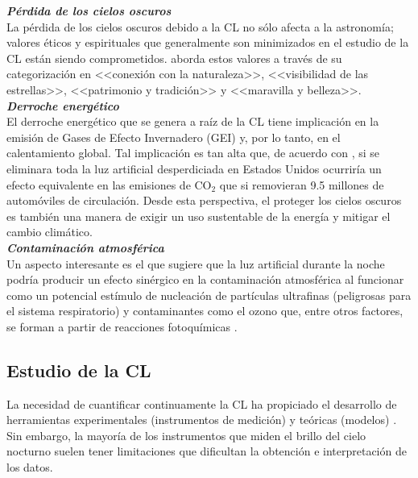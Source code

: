 \textit{\textbf{Pérdida de los cielos oscuros}}\\ 

La pérdida de los cielos oscuros debido a la CL no sólo afecta a la astronomía; valores éticos y espirituales que generalmente son minimizados en el estudio de la CL están siendo comprometidos. \cite{Stone2017} aborda estos valores a través de su categorización en <<conexión con la naturaleza>>, <<visibilidad de las estrellas>>, <<patrimonio y tradición>> y <<maravilla y belleza>>.\\ 


\textit{\textbf{Derroche energético}}\\ 

El derroche energético que se genera a raíz de la CL tiene implicación en la emisión de Gases de Efecto Invernadero (GEI) y, por lo tanto, en el calentamiento global. Tal implicación es tan alta que, de acuerdo con \cite{Gallaway2010}, si se eliminara toda la luz artificial desperdiciada en Estados Unidos ocurriría un efecto equivalente en las emisiones de CO$_{2}$ que si removieran 9.5 millones de automóviles de circulación. Desde esta perspectiva, el proteger los cielos oscuros es también una manera de exigir un uso sustentable de la energía y mitigar el cambio climático.\\ 

\textit{\textbf{Contaminación atmosférica}}\\ 

Un aspecto interesante es el que sugiere que la luz artificial durante la noche podría producir un efecto sinérgico en la contaminación atmosférica al funcionar como un potencial estímulo de nucleación de partículas ultrafinas (peligrosas para el sistema respiratorio) y contaminantes como el ozono que, entre otros factores, se forman a partir de reacciones fotoquímicas \citep{LibroCL}.\\ 

\newpage 
 
\subsection{Estudio de la CL}

La necesidad de cuantificar continuamente la CL ha propiciado el desarrollo de herramientas experimentales (instrumentos de medición) y teóricas (modelos) \citep{Kocifaj2015}. Sin embargo, la mayoría de los instrumentos que miden el brillo del cielo nocturno suelen tener limitaciones que dificultan la obtención e interpretación de los datos.\\

